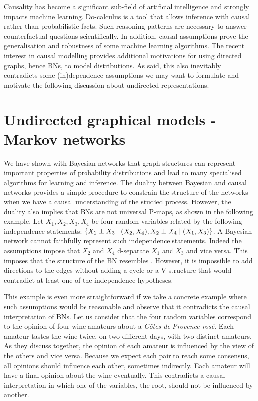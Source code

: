 Causality has become a significant sub-field of artificial intelligence and strongly impacts machine learning. Do-calculus \citep{pearl1994probabilistic} is a tool that allows inference with causal rather than probabilistic facts. Such reasoning patterns are necessary to answer counterfactual questions scientifically. In addition, causal assumptions prove the generalisation and robustness of some machine learning algorithms. The recent interest in causal modelling provides additional motivations for using directed graphs, hence BNs, to model distributions. As said, this also inevitably contradicts some (in)dependence assumptions we may want to formulate and motivate the following discussion about undirected representations.
\section{Undirected graphical models - Markov networks}
We have shown with Bayesian networks that graph structures can represent important properties of probability distributions and lead to many specialised algorithms for learning and inference. The duality between Bayesian and causal networks provides a simple procedure to constrain the structure of the networks when we have a causal understanding of the studied process. However, the duality also implies that BNs are not universal P-maps, as shown in the following example. Let $X_1, X_2, X_3, X_4$ be four random variables related by the following independence statements: $\{ X_1 \perp X_3 \mid (X_2, X_4), X_2 \perp X_4 \mid (X_1, X_3)\}$. A Bayesian network cannot faithfully represent such independence statements. Indeed the assumptions impose that $X_2$ and $X_4$ d-separate $X_1$ and $X_3$ and vice versa. This imposes that the structure of the BN resembles . However, it is impossible to add directions to the edges without adding a cycle or a V-structure that would contradict at least one of the independence hypotheses.

This example is even more straightforward if we take a concrete example where such assumptions would be reasonable and observe that it contradicts the causal interpretation of BNs. Let us consider that the four random variables correspond to the opinion of four wine amateurs about a \textit{C{\^o}tes de Provence ros{\'e}}. Each amateur tastes the wine twice, on two different days, with two distinct amateurs. As they discuss together, the opinion of each amateur is influenced by the view of the others and vice versa. Because we expect each pair to reach some consensus, all opinions should influence each other, sometimes indirectly.  Each amateur will have a final opinion about the wine eventually. This contradicts a causal interpretation in which one of the variables, the root, should not be influenced by another.

